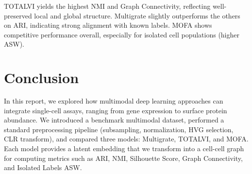 \documentclass{article}
\begin{document}
TOTALVI yields the highest NMI and Graph Connectivity, reflecting well-preserved local and global structure. 
Multigrate slightly outperforms the others on ARI, indicating strong alignment with known labels. 
MOFA shows competitive performance overall, especially for isolated cell populations (higher ASW). 

\section{Conclusion}
In this report, we explored how multimodal deep learning approaches can integrate single-cell assays, 
ranging from gene expression to surface protein abundance. We introduced a benchmark multimodal dataset, 
performed a standard preprocessing pipeline (subsampling, normalization, HVG selection, CLR transform), 
and compared three models: Multigrate, TOTALVI, and MOFA. Each model provides a latent embedding 
that we transform into a cell-cell graph for computing metrics such as ARI, NMI, Silhouette Score, 
Graph Connectivity, and Isolated Labels ASW.
\end{document}
